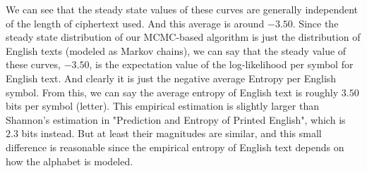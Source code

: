 \documentclass[12pt]{article}
\begin{document}
We can see that the steady state values of these curves are generally independent of the length of ciphertext used. And this average is around $-3.50$. Since the steady state distribution of our MCMC-based algorithm is just the distribution of English texts (modeled as Markov chains), we can say that the steady value of these curves, $-3.50$, is the expectation value of the log-likelihood per symbol for English text. And clearly it is just the negative average Entropy per English symbol. From this, we can say the average entropy of English text is roughly $3.50$ bits per symbol (letter). This empirical estimation is slightly larger than Shannon's estimation in "Prediction and Entropy of Printed English", which is $2.3$ bits instead. But at least their magnitudes are similar, and this small difference is reasonable since the empirical entropy of English text depends on how the alphabet is modeled.
\end{document}
